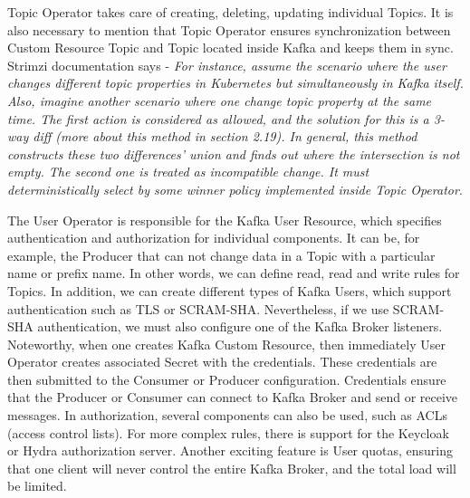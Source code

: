 Topic Operator takes care of creating, deleting, updating individual Topics. It is also necessary to mention that Topic Operator ensures synchronization between Custom Resource Topic and Topic located inside Kafka and keeps them in sync. Strimzi documentation says - \emph{For
instance, assume the scenario where the user changes different topic properties in Kubernetes
but simultaneously in Kafka itself. Also, imagine another scenario where one change topic property at the same time. The first action is considered as allowed, and the solution for this is a 3-way diff (more about this method in section 2.19). In general, this method constructs these two differences' union and finds out where the intersection is not empty. The second one is treated as incompatible change. It must deterministically select by some winner policy implemented inside Topic Operator}.

The User Operator is responsible for the Kafka User Resource, which specifies authentication and authorization for individual components. It can be, for example, the Producer that can not change data in a Topic with a particular name or prefix name. In other words, we can define read, read and write rules for Topics. In addition, we can create different types of Kafka Users, which support authentication such as TLS or SCRAM-SHA. Nevertheless, if we use SCRAM-SHA authentication, we must also configure one of the Kafka Broker listeners. Noteworthy, when one creates Kafka Custom Resource, then immediately User Operator creates associated Secret with the credentials. These credentials are then submitted to the Consumer or Producer configuration. Credentials ensure that the Producer or Consumer can connect to Kafka Broker and send or receive messages. In authorization, several components can also be used, such as ACLs (access control lists). For more complex rules, there is support for the Keycloak or Hydra authorization server. Another exciting feature is User quotas, ensuring that one client will never control the entire Kafka Broker, and the total load will be limited.


